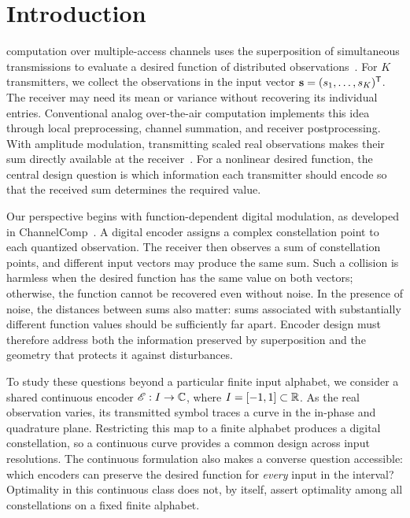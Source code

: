\section{Introduction}
 computation over multiple-access channels uses the superposition of simultaneous transmissions to evaluate a desired function of distributed observations~\cite{nazer2007,sahin2023survey}. For $K$ transmitters, we collect the observations in the input vector $\mathbf s=(s_1,\ldots,s_K)^\mathsf T$. The receiver may need its mean or variance without recovering its individual entries. Conventional analog over-the-air computation implements this idea through local preprocessing, channel summation, and receiver postprocessing. With amplitude modulation, transmitting scaled real observations makes their sum directly available at the receiver~\cite{channelcomp2024}. For a nonlinear desired function, the central design question is which information each transmitter should encode so that the received sum determines the required value.

Our perspective begins with function-dependent digital modulation, as developed in ChannelComp~\cite{channelcomp2024}. A digital encoder assigns a complex constellation point to each quantized observation. The receiver then observes a sum of constellation points, and different input vectors may produce the same sum. Such a collision is harmless when the desired function has the same value on both vectors; otherwise, the function cannot be recovered even without noise. In the presence of noise, the distances between sums also matter: sums associated with substantially different function values should be sufficiently far apart. Encoder design must therefore address both the information preserved by superposition and the geometry that protects it against disturbances.

To study these questions beyond a particular finite input alphabet, we consider a shared continuous encoder $\mathscr E:I\to\mathbb C$, where $I=[-1,1]\subset\mathbb R$. As the real observation varies, its transmitted symbol traces a curve in the in-phase and quadrature plane. Restricting this map to a finite alphabet produces a digital constellation, so a continuous curve provides a common design across input resolutions. The continuous formulation also makes a converse question accessible: which encoders can preserve the desired function for \emph{every} input in the interval? Optimality in this continuous class does not, by itself, assert optimality among all constellations on a fixed finite alphabet.

